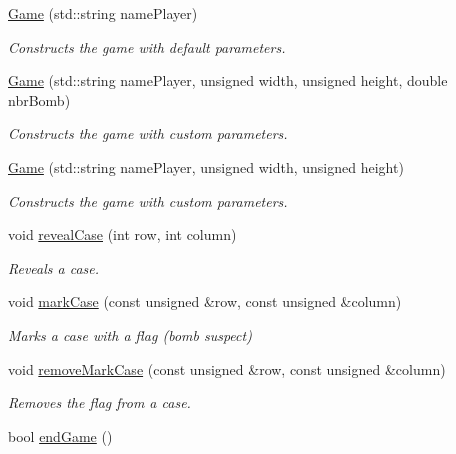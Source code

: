 \begin{DoxyCompactItemize}
\item 
\mbox{\label{class_game_a925373fdd71dbf023343bd1ad96cf2c2}} 
\hyperlink{class_game_a925373fdd71dbf023343bd1ad96cf2c2}{Game} (std\+::string name\+Player)
\begin{DoxyCompactList}\small\item\em Constructs the game with default parameters. \end{DoxyCompactList}\item 
\hyperlink{class_game_ac393a8a23dcb6357c45885f42940458e}{Game} (std\+::string name\+Player, unsigned width, unsigned height, double nbr\+Bomb)
\begin{DoxyCompactList}\small\item\em Constructs the game with custom parameters. \end{DoxyCompactList}\item 
\hyperlink{class_game_a7326de784e68fe0ef3bd6004bc0c6f8c}{Game} (std\+::string name\+Player, unsigned width, unsigned height)
\begin{DoxyCompactList}\small\item\em Constructs the game with custom parameters. \end{DoxyCompactList}\item 
void \hyperlink{class_game_a55e7cb0517ed8bc8f0cbe6d3b2be6994}{reveal\+Case} (int row, int column)
\begin{DoxyCompactList}\small\item\em Reveals a case. \end{DoxyCompactList}\item 
void \hyperlink{class_game_ab83061fabcbe5b952235162cc5f55df0}{mark\+Case} (const unsigned \&row, const unsigned \&column)
\begin{DoxyCompactList}\small\item\em Marks a case with a flag (bomb suspect) \end{DoxyCompactList}\item 
void \hyperlink{class_game_adccaa192130e7d6f5c5973b136c0e1c7}{remove\+Mark\+Case} (const unsigned \&row, const unsigned \&column)
\begin{DoxyCompactList}\small\item\em Removes the flag from a case. \end{DoxyCompactList}\item 
bool \hyperlink{class_game_a82206afb0164fe775b2738236098caa6}{end\+Game} ()
\item 

\end{DoxyCompactItemize}
